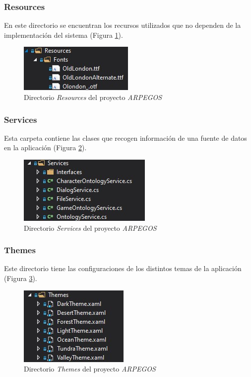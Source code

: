 {\subsubsection{Resources}
En este directorio se encuentran los recursos utilizados que no dependen 
de la implementación del sistema (Figura \ref*{Resources}).

\begin{figure}[H]
    \centering
    \includegraphics[scale=1.5]{Images/ARPEGOS_Resources.jpg}
    \caption{Directorio \textit{Resources} del proyecto \textit{ARPEGOS}}
    \label{Resources}    
\end{figure}

\subsubsection{Services}
Esta carpeta contiene las clases que recogen información 
de una fuente de datos en la aplicación (Figura \ref*{Services}).

\begin{figure}[H]
    \centering
    \includegraphics[scale=1.5]{Images/ARPEGOS_Services.jpg}
    \caption{Directorio \textit{Services} del proyecto \textit{ARPEGOS}}
    \label{Services}    
\end{figure}

\subsubsection{Themes}
Este directorio tiene las configuraciones de los distintos temas
de la aplicación (Figura \ref*{Themes}).

\begin{figure}[H]
    \centering
    \includegraphics[scale=1.5]{Images/ARPEGOS_Themes.jpg}
    \caption{Directorio \textit{Themes} del proyecto \textit{ARPEGOS}}
    \label{Themes}    
\end{figure}

}
